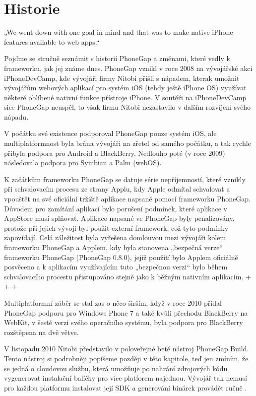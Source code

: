 \section{Historie}
„We went down with one goal in mind and that was to make native iPhone features available to web apps.“ \cite{phonegap_announcement}

Pojďme se stručně seznámit s historií PhoneGap a změnami, které vedly k frameworku, jak jej známe dnes. PhoneGap vznikl v roce 2008 na vývojářské akci iPhoneDevCamp, kde vývojáři firmy Nitobi přišli s nápadem, kterak umožnit vývojářům webových aplikací pro systém iOS (tehdy ještě iPhone OS) využívat některé oblíbené nativní funkce přístroje iPhone. V soutěži na iPhoneDevCamp sice PhoneGap neuspěl, to však firmu Nitobi nezastavilo v dalším rozvíjení svého nápadu.

V počátku své existence podporoval PhoneGap pouze systém iOS, ale multiplatformnost byla brána vývojáři na zřetel od samého počátku, a tak rychle přibyla podpora pro Android a BlackBerry. Nedlouho poté (v roce 2009) následovala podpora pro Symbian a Palm (webOS).

K začátkům frameworku PhoneGap se datuje série nepříjemností, které vznikly při schvalovacím procesu ze strany Applu, kdy Apple odmítal schvalovat a vpouštět na své oficiální tržiště aplikace napsané pomocí frameworku PhoneGap. Důvodem pro zamítání aplikací bylo porušení podmínek, které aplikace v AppStore musí splňovat. Aplikace napsané ve PhoneGap byly penalizovány, protože při jejich vývoji byl použit externí framework, což tyto podmínky zapovídají. Celá záležitost byla vyřešena domlouvou mezi vývojáři kolem frameworku PhoneGap a Applem, kdy byla stanovena „bezpečná verze“ frameworku PhoneGap (PhoneGap 0.8.0), jejíž použití bylo Applem oficiálně posvěceno a k aplikacím využívajícím tuto „bezpečnou verzi“ bylo během schvalovacího procestu přistupováno stejně jako k běžným nativním aplikacím. \cite{open_letter_to_apple} + \cite{updates_on_apple} + \cite{phonegap_permitted_appstore} + \cite{phonegap_store_approval}

Multiplatformní záběr se stal zas o něco širším, když v roce 2010 přidal PhoneGap podporu pro Windows Phone 7 a také kvůli přechodu BlackBerry na WebKit, v šesté verzi svého operačního systému, byla podpora pro BlackBerry rozštěpena na dvě větve.

V listopadu 2010 Nitobi představilo v poloveřejné betě nástroj PhoneGap Build. Tento nástroj si podrobněji popíšeme později v této kapitole, teď jen zmíním, že se jedná o cloudovou službu, která umožňuje po nahrání zdrojových kódu vygenerovat instalační balíčky pro více platforem najednou. Vývojář tak nemusí pro každou platformu instalovat její SDK a generování binárek provádět ručně \cite{announcing_phonegap_build_beta}. 

